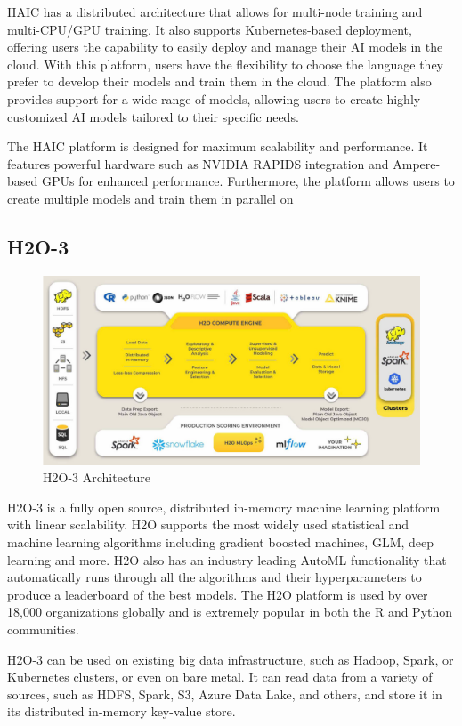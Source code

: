 \documentclass[12pt,a4paper]{report}
\begin{document}
\ac{HAIC} has a distributed architecture that allows for multi-node training and multi-CPU/GPU 
training. It also supports Kubernetes-based deployment, offering users the capability to easily 
deploy and manage their AI models in the cloud. With this platform, users have the flexibility to 
choose the language they prefer to develop their models and train them in the cloud. The platform 
also provides support for a wide range of models, allowing users to create highly customized AI 
models tailored to their specific needs.

The \ac{HAIC} platform is designed for maximum scalability and performance. It features powerful 
hardware such as NVIDIA RAPIDS integration and Ampere-based GPUs for enhanced performance. 
Furthermore, the platform allows users to create multiple models and train them in parallel on


\subsection{H2O-3}
\begin{figure}[H]
\centering
\includegraphics[width=1\textwidth]{h2o3.png}
\caption{H2O-3 Architecture}
\end{figure}


H2O-3 is a fully open source, distributed in-memory machine learning platform with linear scalability. 
H2O supports the most widely used statistical and machine learning algorithms including 
gradient boosted machines, \ac{GLM}, deep learning and more. 
H2O also has an industry leading AutoML functionality that automatically runs through all the 
algorithms and their hyperparameters to produce a leaderboard of the best models. The H2O platform 
is used by over 18,000 organizations globally and is extremely popular in both the R and Python communities.

H2O-3 can be used on existing big data infrastructure, such as Hadoop, Spark, or Kubernetes clusters, or even on bare metal. It can read data from a variety of sources, such as HDFS, Spark, S3, Azure Data Lake, and others, and store it in its distributed in-memory key-value store.
\end{document}
